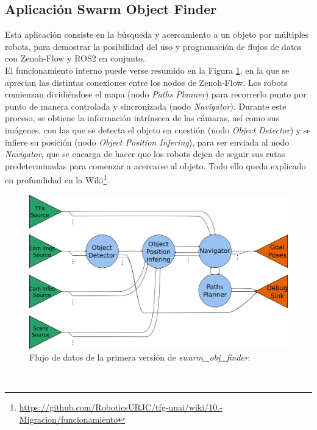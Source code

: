 \subsection{Aplicación Swarm Object Finder}
\label{sec:swarm_obj_finder}

Esta aplicación consiste en la búsqueda y acercamiento a un objeto por múltiples
robots, para demostrar la posibilidad del uso y programación de flujos de datos
con Zenoh-Flow y ROS2 en conjunto.
\\

El funcionamiento interno puede verse resumido en la Figura
\ref{fig:data_flow_scheme}, en la que se aprecian las distintas conexiones entre
los nodos de Zenoh-Flow.
Los robots comienzan dividiéndose el mapa (nodo \textit{Paths Planner}) para
recorrerlo punto por punto de manera controlada y sincronizada (nodo
\textit{Navigator}).
Durante este proceso, se obtiene la información intrínseca de las cámaras, así
como sus imágenes, con las que se detecta el objeto en cuestión (nodo
\textit{Object Detector}) y se infiere su posición (nodo \textit{Object Position
Infering}), para ser enviada al nodo \textit{Navigator}, que se encarga de hacer
que los robots dejen de seguir sus rutas predeterminadas para comenzar a
acercarse al objeto.
Todo ello queda explicado en profundidad en la Wiki\footnote{
\href{https://github.com/RoboticsURJC/tfg-unai/wiki/10.-Migraci\%C3\%B3n-de-swarm\_obj\_finder-a-la-nueva-version-de-Zenoh\%E2\%80\%90flow-\%5B20-Ago-\%E2\%80\%90-30-Sep\%5D\#c\%C3\%B3mo-funciona-swarm\_obj\_finder-y-zenoh-flow}{https://github.com/RoboticsURJC/tfg-unai/wiki/10.-Migracion/funcionamiento}}.

\begin{figure} [h!]
  \begin{center}
    \includegraphics[width=12cm]{figs/data_flow_scheme}
  \end{center}
  \caption{Flujo de datos de la primera versión de \textit{swarm\_obj\_finder}.}
  \label{fig:data_flow_scheme}
\end{figure}\


